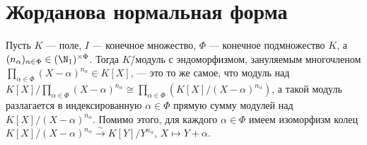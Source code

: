 \documentclass[
	extrafontsizes,
	11pt,
	hyphens,
]{memoir}
\begin{document}
%


\section{Жорданова нормальная форма}

\begin{observation}
Пусть \(K\) --- поле, \(I\) --- конечное множество, \(\Phi\) --- конечное подмножество \(K\), а \((n_\alpha)_{\alpha \in \Phi} \in (\N_1)^{\times \Phi}\).%
\label{obs:JordFormDecomp}
Тогда \(K\)\=/модуль с эндоморфизмом, зануляемым многочленом \(\prod_{\alpha \in \Phi} (X - \alpha)^{n_\alpha} \in K[X]\), --- это то же самое, что модуль над \(K[X] / \prod_{\alpha \in \Phi} (X - \alpha)^{n_\alpha} \cong \prod_{\alpha \in \Phi} (K[X] / (X - \alpha)^{n_\alpha})\),
а такой модуль разлагается в индексированную \(\alpha \in \Phi\) прямую сумму модулей над \(K[X] / (X - \alpha)^{n_\alpha}\). Помимо этого, для каждого \(\alpha \in \Phi\) имеем изоморфизм колец \(K[X] / (X - \alpha)^{n_\alpha} \xrightarrow{\sim} K[Y] / Y^{n_\alpha}\), \(X \mapsto Y + \alpha\).
\end{observation}
\end{document}
